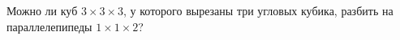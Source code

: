 Можно ли куб $3 \times 3 \times 3$, у которого вырезаны три угловых кубика, разбить на параллелепипеды $1 \times 1 \times 2$?
